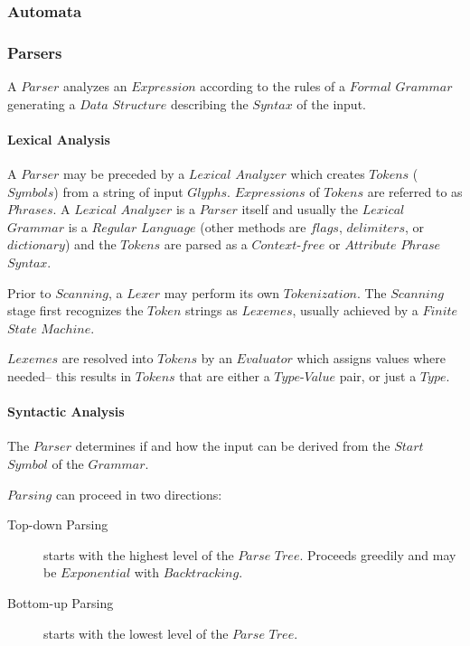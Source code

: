 \documentclass{article}
\begin{document}
\subsubsection{Automata}

\subsubsection{Parsers}

    A $Parser$ analyzes an $Expression$ according to the rules of a
    $Formal$ $Grammar$ generating a $Data$ $Structure$ describing the
    $Syntax$ of the input.

    \paragraph{Lexical Analysis}
    A $Parser$ may be preceded by a $Lexical$ $Analyzer$ which creates
    $Tokens$ ($Symbols$) from a string of input
    $Glyphs$. $Expressions$ of $Tokens$ are referred to as
    $Phrases$. A $Lexical$ $Analyzer$ is a $Parser$ itself and usually
    the $Lexical$ $Grammar$ is a $Regular$ $Language$ (other methods
    are $flags$, $delimiters$, or $dictionary$) and the $Tokens$ are
    parsed as a $Context$-$free$ or $Attribute$ $Phrase$ $Syntax$.

    Prior to $Scanning$, a $Lexer$ may perform its own $Tokenization$.
    The $Scanning$ stage first recognizes the $Token$ strings as
    $Lexemes$, usually achieved by a $Finite$ $State$ $Machine$.

    $Lexemes$ are resolved into $Tokens$ by an $Evaluator$ which
    assigns values where needed-- this results in $Tokens$ that are
    either a $Type$-$Value$ pair, or just a $Type$.

    \paragraph{Syntactic Analysis}

    The $Parser$ determines if and how the input can be derived from
    the $Start$ $Symbol$ of the $Grammar$.

    $Parsing$ can proceed in two directions:

    \begin{description}
    \item[Top-down Parsing]
    starts with the highest level of the $Parse$ $Tree$. Proceeds
    greedily and may be $Exponential$ with $Backtracking$.
    \item[Bottom-up Parsing]
    starts with the lowest level of the $Parse$ $Tree$.
    \end{description}
\end{document}
